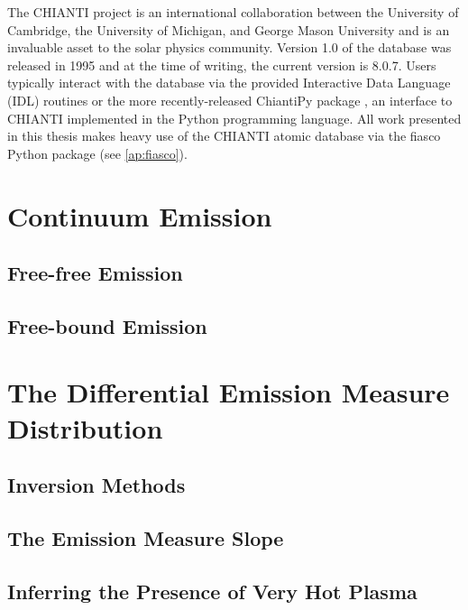The CHIANTI project is an international collaboration between the University of Cambridge, the University of Michigan, and George Mason University and is an invaluable asset to the solar physics community. Version 1.0 of the database was released in 1995 and at the time of writing, the current version is 8.0.7. Users typically interact with the database via the provided Interactive Data Language (IDL) routines or the more recently-released ChiantiPy package \citep{landi_chiantiatomic_2012,barnes_chiantipy_2017}, an interface to CHIANTI implemented in the Python programming language. All work presented in this thesis makes heavy use of the CHIANTI atomic database via the fiasco Python package (see \autoref{ap:fiasco}).

\section{Continuum Emission}\label{sec:continuum}


\subsection{Free-free Emission}

\subsection{Free-bound Emission}

\section{The Differential Emission Measure Distribution}\label{sec:dem}


\subsection{Inversion Methods}

\subsection{The Emission Measure Slope}

\subsection{Inferring the Presence of Very Hot Plasma}


